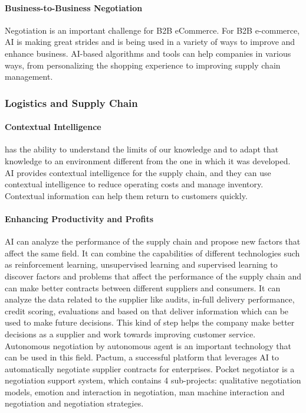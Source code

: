 \paragraph{Business-to-Business Negotiation} Negotiation is an important challenge for B2B eCommerce. For B2B e-commerce, AI is making great strides and is being used in a variety of ways to improve and enhance business\parencite{Hans01}. AI-based algorithms and tools can help companies in various ways, from personalizing the shopping experience to improving supply chain management.

\subsubsection{Logistics and Supply Chain}
\paragraph{Contextual Intelligence} has the ability to understand the limits of our knowledge and to adapt that knowledge to an environment different from the one in which it was developed. AI provides contextual intelligence for the supply chain, and they can use contextual intelligence to reduce operating costs and manage inventory. Contextual information can help them return to customers quickly.   
\paragraph{Enhancing Productivity and Profits} AI can analyze the performance of the supply chain and propose new factors that affect the same field. It can combine the capabilities of different technologies such as reinforcement learning, unsupervised learning and supervised learning to discover factors and problems that affect the performance of the supply chain and can make better contracts between different suppliers and consumers\parencite{Pndey2019}. It can analyze the data related to the supplier like audits, in-full delivery performance, credit scoring, evaluations and based on that deliver information which can be used to make future decisions. This kind of step helps the company make better decisions as a supplier and work towards improving customer service. Autonomous negotiation by autonomous agent is an important technology that can be used in this field. Pactum, a successful platform that leverages AI to automatically negotiate supplier contracts for enterprises. Pocket negotiator is a negotiation support system, which contains 4 sub-projects: qualitative negotiation models, emotion and interaction in negotiation, man machine interaction and negotiation and negotiation strategies. 


